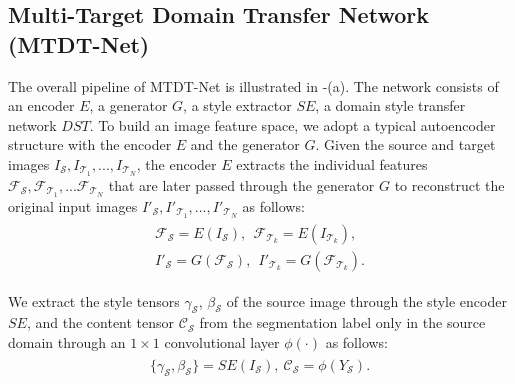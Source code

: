 \subsection{Multi-Target Domain Transfer Network (MTDT-Net)}
\label{sec:MTDT-Net}
The overall pipeline of MTDT-Net is illustrated in -(a).
The network consists of an encoder $E$, a generator $G$, a style extractor $SE$, a domain style transfer network $DST$.
To build an image feature space, we adopt a typical autoencoder structure with the encoder $E$ and the generator $G$.
Given the source and target images $I_\mathcal{S}, I_{\mathcal{T}_1}, ..., I_{\mathcal{T}_N}$, the encoder $E$ extracts the individual features $\mathcal{F}_\mathcal{S}, \mathcal{F}_{\mathcal{T}_1}, ... \mathcal{F}_{\mathcal{T}_N}$ that are later passed through the generator $G$ to reconstruct the original input images $I'_\mathcal{S}, I'_{\mathcal{T}_1}, ..., I'_{\mathcal{T}_N}$ as follows:
\begin{gather}
\begin{split}
\mathcal{F}_{\mathcal{S}} = E(I_\mathcal{S}), ~~ \mathcal{F}_{\mathcal{T}_k} = E(I_{\mathcal{T}_k}), \\
I'_\mathcal{S} = G(\mathcal{F}_\mathcal{S}), ~~ I'_{\mathcal{T}_k} = G(\mathcal{F}_{\mathcal{T}_k}).
\end{split}
\label{eq:direct_recon}
\end{gather}

We extract the style tensors $\gamma_\mathcal{S}$, $\beta_\mathcal{S}$ of the source image through the style encoder $SE$, and the content tensor $\mathcal{C}_\mathcal{S}$ from the segmentation label only in the source domain through an $1\times1$ convolutional layer $\phi(\cdot)$ as follows:
\begin{gather}
\begin{split}
\{\gamma_\mathcal{S}, \beta_\mathcal{S}\} = SE(I_\mathcal{S}),~\mathcal{C_S}=\phi(Y_\mathcal{S}). \end{split}
\label{eq:indirect_recon1}
\end{gather}

